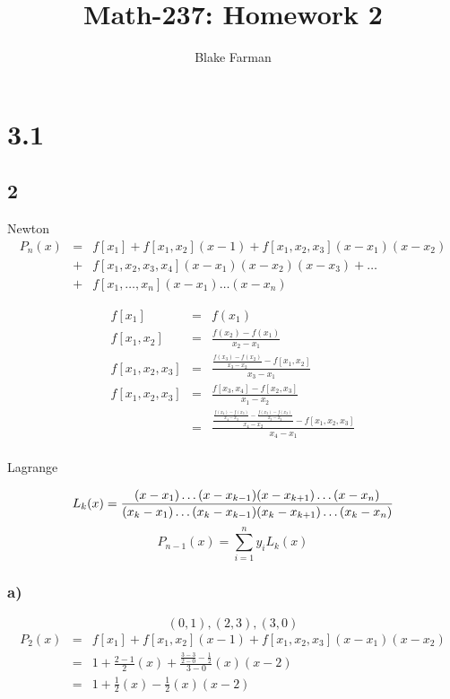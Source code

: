 \documentclass[12pt]{article}
\author{Blake Farman}
\title{Math-237: Homework 2}
\begin{document}
\maketitle
\newpage
\section*{3.1}
\subsection*{2}
Newton
\begin{eqnarray*}
P_n(x) & = & f[x_1] + f[x_1, x_2](x-1) + f[x_1, x_2, x_3](x-x_1)(x-x_2)\\
& + & f[x_1, x_2, x_3, x_4](x-x_1)(x-x_2)(x-x_3) + \ldots\\
& + & f[x_1, \ldots, x_n](x-x_1)\ldots(x-x_n)
\end{eqnarray*}

\begin{eqnarray*}
  f[x_1] & = & f(x_1)\\
  f[x_1, x_2] & = & \frac{f(x_2) - f(x_1)}{x_2 - x_1}\\
  f[x_1, x_2, x_3] & = & \frac{\frac{f(x_3) - f(x_2)}{x_3 - x_2} - f[x_1, x_2]}{x_3 - x_1}\\
  f[x_1, x_2, x_3] & = & \frac{f[x_3, x_4] - f[x_2, x_3]}{x_1-x_2}\\
  & = & \frac{\frac{\frac{f(x_4) - f(x_3)}{x_4 - x_3} - \frac{f(x_3) - f(x_2)}{x_3 - x_2}}{x_4-x_2} - f[x_1, x_2, x_3]}{x_4 - x_1}\\
\end{eqnarray*}

Lagrange

\[
L_k(x) = \frac{(x-x_1)\ldots(x-x_{k-1})(x-x_{k+1})\ldots(x-x_n)}
   {
     (x_k-x_1)
     \ldots
     (x_k-x_{k-1})
     (x_k-x_{k+1})
     \ldots
     (x_k-x_n)
   }\\
\]
\[P_{n-1}(x) = \sum_{i=1}^{n}y_iL_k(x)\]

\subsubsection*{a)}
\[(0,1), (2,3), (3,0)\]
\begin{eqnarray*}
  P_2(x) & = & f[x_1] + f[x_1, x_2](x-1) + f[x_1, x_2, x_3](x-x_1)(x-x_2)\\ 
  & = & 1 + \frac{2 - 1}{2}(x) + \frac{\frac{3-3}{2-0} - \frac{1}{2}}{3-0}(x)(x - 2)\\
  & = & 1 + \frac{1}{2}(x) - \frac{1}{2}(x)(x-2)
\end{eqnarray*}
\end{document}
